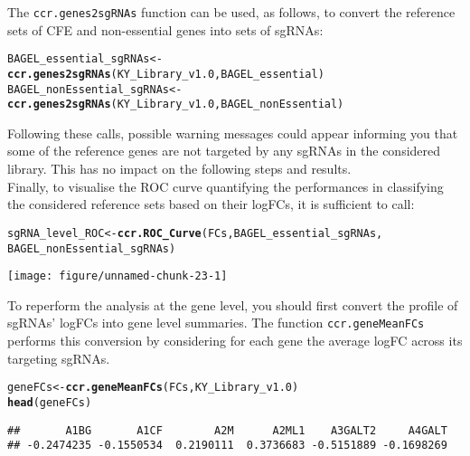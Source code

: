 \documentclass{article}\usepackage[]{graphicx}\usepackage[]{color}
\makeatletter
\def\maxwidth{ %
  \ifdim\Gin@nat@width>\linewidth
    \linewidth
  \else
    \Gin@nat@width
  \fi
}
\newcommand{\hlstd}[1]{\textcolor[rgb]{0.345,0.345,0.345}{#1}}%
\newcommand{\hlkwb}[1]{\textcolor[rgb]{0.69,0.353,0.396}{#1}}%
\newcommand{\hlkwd}[1]{\textcolor[rgb]{0.737,0.353,0.396}{\textbf{#1}}}%
\newenvironment{kframe}{%
 \def\at@end@of@kframe{}%
 \ifinner\ifhmode%
  \def\at@end@of@kframe{\end{minipage}}%
  \begin{minipage}{\columnwidth}%
 \fi\fi%
 \def\FrameCommand##1{\hskip\@totalleftmargin \hskip-\fboxsep
 \colorbox{shadecolor}{##1}\hskip-\fboxsep
     \hskip-\linewidth \hskip-\@totalleftmargin \hskip\columnwidth}%
 \MakeFramed {\advance\hsize-\width
   \@totalleftmargin\z@ \linewidth\hsize
   \@setminipage}}%
 {\par\unskip\endMakeFramed%
 \at@end@of@kframe}
\newenvironment{knitrout}{}{} %
\makeatother
\begin{document}
The \texttt{ccr.genes2sgRNAs} function can be used, as follows, to convert the reference sets of CFE and non-essential genes into sets of sgRNAs:



\begin{knitrout}
\color{fgcolor}\begin{kframe}
\begin{alltt}
\hlstd{BAGEL_essential_sgRNAs}\hlkwb{<-}
    \hlkwd{ccr.genes2sgRNAs}\hlstd{(KY_Library_v1.0,BAGEL_essential)}
\hlstd{BAGEL_nonEssential_sgRNAs}\hlkwb{<-}
    \hlkwd{ccr.genes2sgRNAs}\hlstd{(KY_Library_v1.0,BAGEL_nonEssential)}
\end{alltt}
\end{kframe}
\end{knitrout}



Following these calls, possible warning messages could appear informing you that some of the reference genes are not targeted by any sgRNAs in the considered library. This has no impact on the following steps and results.\\

Finally, to visualise the ROC curve quantifying the performances in classifying the considered reference sets based on their logFCs, it is sufficient to call:
\begin{knitrout}
\color{fgcolor}\begin{kframe}
\begin{alltt}
\hlstd{sgRNA_level_ROC}\hlkwb{<-}\hlkwd{ccr.ROC_Curve}\hlstd{(FCs,BAGEL_essential_sgRNAs,}
                              \hlstd{BAGEL_nonEssential_sgRNAs)}
\end{alltt}
\end{kframe}
\texttt{[image: figure/unnamed-chunk-23-1]} 

\end{knitrout}
%
To reperform the analysis at the gene level, you should first convert the profile of sgRNAs' logFCs into gene level summaries. The function \texttt{ccr.geneMeanFCs} performs this conversion by considering for each gene the average logFC across its targeting sgRNAs.

\begin{knitrout}
\color{fgcolor}\begin{kframe}
\begin{alltt}
\hlstd{geneFCs}\hlkwb{<-}\hlkwd{ccr.geneMeanFCs}\hlstd{(FCs,KY_Library_v1.0)}
\hlkwd{head}\hlstd{(geneFCs)}
\end{alltt}
\begin{verbatim}
##       A1BG       A1CF        A2M      A2ML1    A3GALT2     A4GALT 
## -0.2474235 -0.1550534  0.2190111  0.3736683 -0.5151889 -0.1698269
\end{verbatim}
\end{kframe}
\end{knitrout}
\end{document}
